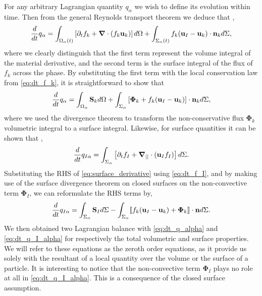 For any arbitrary Lagrangian quantity $q_\alpha$ we wish to define its evolution within time.
Then from the general Reynolds transport theorem we deduce that \citep{morel2015mathematical},
\begin{equation}
    \frac{d}{d t}  q_\alpha
    = \int_{\Omega_\alpha(t)}\left[ \partial_t f_k + \bm{\nabla} \cdot\left(f_k\textbf{u}_k\right) \right]d\Omega\\
    + \int_{\Sigma_\alpha(t)} f_k (\textbf{u}_I-\textbf{u}_k)\cdot \textbf{n}_k d\Sigma,
\end{equation}
where we clearly distinguish that the first term represent the volume integral of the material derivative, and the second term is the surface integral of the flux of $f_k$ across the phase.
By substituting the first term with the local conservation law from \ref{eq:dt_f_k}, it is straightforward to show that
\begin{equation}
    \frac{d}{d t}  q_\alpha
    = \int_{\Omega_\alpha} \textbf{S}_k d\Omega
    + \int_{\Sigma_\alpha} \left[\bm{\Phi}_k + f_k (\textbf{u}_I-\textbf{u}_k) \right] \cdot \textbf{n}_k d\Sigma,
    \label{eq:dt_q_alpha}
\end{equation}
where we used the divergence theorem to transform the non-conservative flux $\bm{\Phi}_k$ volumetric integral to a surface integral.
Likewise, for surface quantities it can be shown that \citep{bothe2022sharp,morel2015mathematical,stone1990simple}, 
\begin{equation}
    \frac{d}{d t}  q_{I\alpha}
    = \int_{\Sigma_\alpha} \left[
        \partial_t f_I
        +   \bm{\nabla}_{||} \cdot (\textbf{u}_If_I)
    \right]d\Sigma.
    \label{eq:surface_derivative}
\end{equation}
Substituting the RHS of \ref{eq:surface_derivative} using \ref{eq:dt_f_I}, and by making use of the surface divergence theorem on closed surfaces \citep{kanwal1998generalized} on the non-convective term $\mathbf{\Phi}_I$, we can reformulate the RHS terms by, 
\begin{equation}
    \frac{d}{d t}  q_{I\alpha}
    = \int_{\Sigma_\alpha} 
        \textbf{S}_I
    d\Sigma
    - \int_{\Sigma_\alpha} \llbracket 
        f_k (\textbf{u}_I - \textbf{u}_k)
        + \mathbf{\Phi}_k
     \rrbracket \cdot \textbf{n}
    d\Sigma.
    \label{eq:dt_q_I_alpha}
\end{equation}
We then obtained two Lagrangian balance with \ref{eq:dt_q_alpha} and \ref{eq:dt_q_I_alpha} for respectively the total volumetric and surface properties.
We will refer to these equations as the zeroth order equations, as it provide us solely with the resultant of a local quantity over the volume or the surface of a particle. 
It is interesting to notice that the non-convective term $\mathbf{\Phi}_I$ plays no role at all in \ref{eq:dt_q_I_alpha}.
This is a consequence of the closed surface assumption. 

